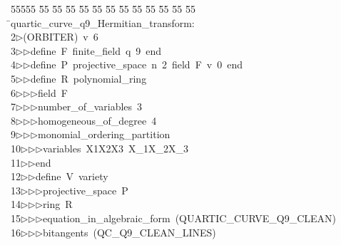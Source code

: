 %
%
\begin{tabbing}
55555 \= 55 \= 55 \= 55 \= 55 \= 55 \= 55 \= 55 \= 55 \= 55 \= 55 \= 55 \= 55 \= \>quartic\_curve\_q9\_Hermitian\_transform:\\[0pt]
2\>$\triangleright$\>(ORBITER)\ v\ 6\ \\[0pt]
3\>$\triangleright$\>$\triangleright$\>define\ F\ finite\_field\ q\ 9\ end\ \\[0pt]
4\>$\triangleright$\>$\triangleright$\>define\ P\ projective\_space\ n\ 2\ field\ F\ v\ 0\ end\ \\[0pt]
5\>$\triangleright$\>$\triangleright$\>define\ R\ polynomial\_ring\ \\[0pt]
6\>$\triangleright$\>$\triangleright$\>$\triangleright$\>field\ F\ \\[0pt]
7\>$\triangleright$\>$\triangleright$\>$\triangleright$\>number\_of\_variables\ 3\ \\[0pt]
8\>$\triangleright$\>$\triangleright$\>$\triangleright$\>homogeneous\_of\_degree\ 4\ \\[0pt]
9\>$\triangleright$\>$\triangleright$\>$\triangleright$\>monomial\_ordering\_partition\ \\[0pt]
10\>$\triangleright$\>$\triangleright$\>$\triangleright$\>variables\ X1X2X3\ X\_1X\_2X\_3\ \\[0pt]
11\>$\triangleright$\>$\triangleright$\>end\ \\[0pt]
12\>$\triangleright$\>$\triangleright$\>define\ V\ variety\ \\[0pt]
13\>$\triangleright$\>$\triangleright$\>$\triangleright$\>projective\_space\ P\ \\[0pt]
14\>$\triangleright$\>$\triangleright$\>$\triangleright$\>ring\ R\ \\[0pt]
15\>$\triangleright$\>$\triangleright$\>$\triangleright$\>equation\_in\_algebraic\_form\ (QUARTIC\_CURVE\_Q9\_CLEAN)\ \\[0pt]
16\>$\triangleright$\>$\triangleright$\>$\triangleright$\>bitangents\ (QC\_Q9\_CLEAN\_LINES)\ \\[0pt]

\end{tabbing}
